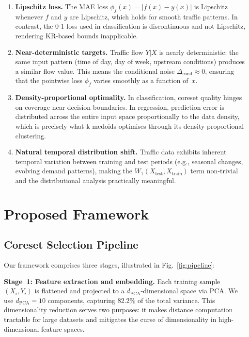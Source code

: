 \documentclass[journal]{IEEEtran}
\newcommand{\Wone}{W_1}
\newcommand{\Xtrain}{X_{\mathrm{train}}}
\newcommand{\Xtest}{X_{\mathrm{test}}}
\begin{document}
\begin{enumerate}
  \item \textbf{Lipschitz loss.}
    The MAE loss $\phi_f(x) = |f(x) - y(x)|$ is Lipschitz whenever
    $f$ and $y$ are Lipschitz, which holds for smooth traffic
    patterns.
    In contrast, the 0-1 loss used in classification is
    discontinuous and not Lipschitz, rendering KR-based bounds
    inapplicable.

  \item \textbf{Near-deterministic targets.}
    Traffic flow $Y | X$ is nearly deterministic: the same input
    pattern (time of day, day of week, upstream conditions) produces
    a similar flow value.
    This means the conditional noise
    $\Delta_{\mathrm{cond}} \approx 0$, ensuring that the pointwise
    loss $\phi_f$ varies smoothly as a function of~$x$.

  \item \textbf{Density-proportional optimality.}
    In classification, coreset quality hinges on coverage near
    decision boundaries.
    In regression, prediction error is distributed across the
    entire input space proportionally to the data density, which
    is precisely what k-medoids optimises through its
    density-proportional clustering.

  \item \textbf{Natural temporal distribution shift.}
    Traffic data exhibits inherent temporal variation between
    training and test periods (e.g., seasonal changes, evolving
    demand patterns), making the $\Wone(\Xtest, \Xtrain)$ term
    non-trivial and the distributional analysis practically
    meaningful.
\end{enumerate}


\section{Proposed Framework}
\label{sec:framework}

\subsection{Coreset Selection Pipeline}

Our framework comprises three stages, illustrated in
Fig.~\ref{fig:pipeline}:

\textbf{Stage~1: Feature extraction and embedding.}
Each training sample $(X_i, Y_i)$ is flattened and projected to a
$d_{\mathrm{PCA}}$-dimensional space via PCA.
We use $d_{\mathrm{PCA}} = 10$ components, capturing 82.2\% of the
total variance.
This dimensionality reduction serves two purposes: it makes
distance computation tractable for large datasets and mitigates the
curse of dimensionality in high-dimensional feature spaces.
\end{document}

